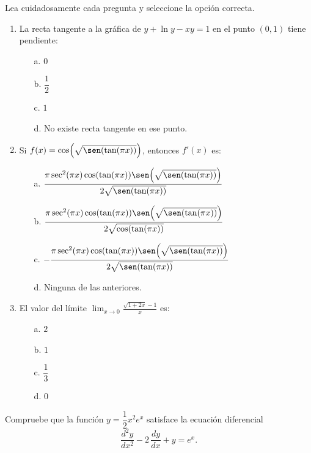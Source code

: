 \begin{prob}
Lea cuidadosamente cada pregunta y seleccione la opción correcta.
\begin{enumerate}
    \item La recta tangente a la gráfica de $y+\ln y - xy=1$ en el
    punto $(0,1)$ tiene pendiente:
    \begin{itemize}
        \item[a.] $0$
        \item[b.] $\dfrac{1}{2}$
        \item[c.] $1$
        \item[d.] No existe recta tangente en ese punto.
    \end{itemize}

    \item Si $f(x)=\cos\!\left(\sqrt{\sen(\tan(\pi x))}\right)$,
    entonces $f'(x)$ es:
    \begin{itemize}
        \item[a.] $\dfrac{\pi\sec^2(\pi x)
        \cos(\tan(\pi x))
        \sen\!\left(\sqrt{\sen(\tan(\pi x))}\right)}
        {2\sqrt{\sen(\tan(\pi x))}}$

        \item[b.] $\dfrac{\pi\sec^2(\pi x)
        \cos(\tan(\pi x))
        \sen\!\left(\sqrt{\sen(\tan(\pi x))}\right)}
        {2\sqrt{\cos(\tan(\pi x))}}$

        \item[c.] $-\dfrac{\pi\sec^2(\pi x)
        \cos(\tan(\pi x))
        \sen\!\left(\sqrt{\sen(\tan(\pi x))}\right)}
        {2\sqrt{\sen(\tan(\pi x))}}$

        \item[d.] Ninguna de las anteriores.
    \end{itemize}

    \item El valor del límite
    $\displaystyle\lim_{x\to 0}\frac{\sqrt{1+2x}-1}{x}$ es:
    \begin{itemize}
        \item[a.] $2$
        \item[b.] $1$
        \item[c.] $\dfrac{1}{3}$
        \item[d.] $0$
    \end{itemize}
\end{enumerate}
\end{prob}

\begin{prob}
Compruebe que la función $y=\dfrac{1}{2}x^2 e^x$ satisface la ecuación
diferencial
\[
\frac{d^2y}{dx^2}-2\,\frac{dy}{dx}+y=e^x.
\]
\end{prob}

